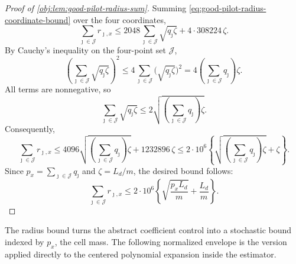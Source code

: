 \documentclass[11pt]{article}
\begin{document}
\begin{proof}[Proof of \cref{obj:lem:good-pilot-radius-sum}]
Summing \cref{eq:good-pilot-radius-coordinate-bound} over the four coordinates,
\[
\sum_{\jmath\in\mathcal J}r_{\jmath,x}
\le
2048\sum_{\jmath\in\mathcal J}\sqrt{q_\jmath\zeta}
+
4\cdot 308224\,\zeta .
\]
By Cauchy's inequality on the four-point set \(\mathcal J\),
\[
\left(\sum_{\jmath\in\mathcal J}\sqrt{q_\jmath\zeta}\right)^2
\le
4\sum_{\jmath\in\mathcal J}\bigl(\sqrt{q_\jmath\zeta}\bigr)^2
=
4\left(\sum_{\jmath\in\mathcal J}q_\jmath\right)\zeta .
\]
All terms are nonnegative, so
\[
\sum_{\jmath\in\mathcal J}\sqrt{q_\jmath\zeta}
\le
2\sqrt{\left(\sum_{\jmath\in\mathcal J}q_\jmath\right)\zeta}.
\]
Consequently,
\[
\sum_{\jmath\in\mathcal J}r_{\jmath,x}
\le
4096\sqrt{\left(\sum_{\jmath\in\mathcal J}q_\jmath\right)\zeta}
+
1232896\,\zeta
\le
2\cdot 10^6
\left\{
\sqrt{\left(\sum_{\jmath\in\mathcal J}q_\jmath\right)\zeta}
+\zeta
\right\}.
\]
Since \(p_x=\sum_{\jmath\in\mathcal J}q_\jmath\) and \(\zeta=L_d/m\), the desired bound follows:
\[
\sum_{\jmath\in\mathcal J} r_{\jmath,x}
\le
2\cdot 10^6
\left\{
\sqrt{\frac{p_xL_d}{m}}+\frac{L_d}{m}
\right\}.
\]
\end{proof}

The radius bound turns the abstract coefficient control into a stochastic bound indexed by \(p_x\), the cell mass. The following normalized envelope is the version applied directly to the centered polynomial expansion inside the estimator.
\end{document}
